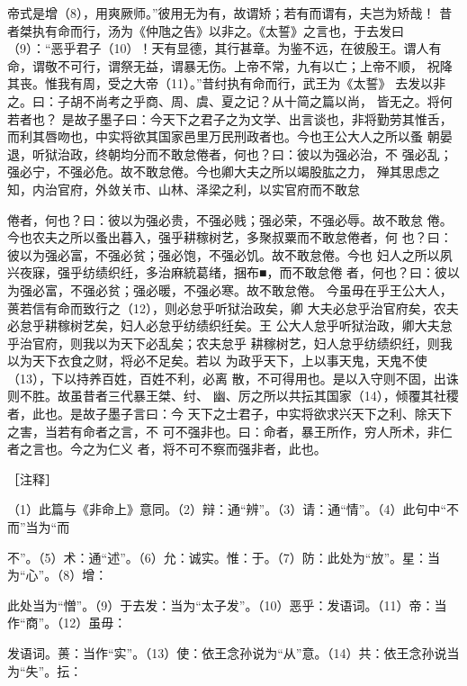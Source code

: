 \documentclass[12pt,UTF8]{ctexbook}
\begin{document}
帝式是增（8），用爽厥师。”彼用无为有，故谓矫；若有而谓有，夫岂为矫哉！ 
昔者桀执有命而行，汤为《仲虺之告》以非之。《太誓》之言也，于去发曰 
（9）：“恶乎君子（10）！天有显德，其行甚章。为鉴不远，在彼殷王。谓人有 
命，谓敬不可行，谓祭无益，谓暴无伤。上帝不常，九有以亡；上帝不顺， 
祝降其丧。惟我有周，受之大帝（11）。”昔纣执有命而行，武王为《太誓》 
去发以非之。曰：子胡不尚考之乎商、周、虞、夏之记？从十简之篇以尚， 
皆无之。将何若者也？ 
是故子墨子曰：今天下之君子之为文学、出言谈也，非将勤劳其惟舌， 
而利其唇吻也，中实将欲其国家邑里万民刑政者也。今也王公大人之所以蚤 
朝晏退，听狱治政，终朝均分而不敢怠倦者，何也？曰：彼以为强必治，不 
强必乱；强必宁，不强必危。故不敢怠倦。今也卿大夫之所以竭股肱之力， 
殚其思虑之知，内治官府，外敛关市、山林、泽梁之利，以实官府而不敢怠 

倦者，何也？曰：彼以为强必贵，不强必贱；强必荣，不强必辱。故不敢怠 
倦。今也农夫之所以蚤出暮入，强乎耕稼树艺，多聚叔粟而不敢怠倦者，何 
也？曰：彼以为强必富，不强必贫；强必饱，不强必饥。故不敢怠倦。今也 
妇人之所以夙兴夜寐，强乎纺绩织纴，多治麻統葛绪，捆布■，而不敢怠倦 
者，何也？曰：彼以为强必富，不强必贫；强必暖，不强必寒。故不敢怠倦。 
今虽毋在乎王公大人，蒉若信有命而致行之（12），则必怠乎听狱治政矣，卿 
大夫必怠乎治官府矣，农夫必怠乎耕稼树艺矣，妇人必怠乎纺绩织纴矣。王 
公大人怠乎听狱治政，卿大夫怠乎治官府，则我以为天下必乱矣；农夫怠乎 
耕稼树艺，妇人怠乎纺绩织纴，则我以为天下衣食之财，将必不足矣。若以 
为政乎天下，上以事天鬼，天鬼不使（13），下以持养百姓，百姓不利，必离 
散，不可得用也。是以入守则不固，出诛则不胜。故虽昔者三代暴王桀、纣、 
幽、厉之所以共抎其国家（14），倾覆其社稷者，此也。是故子墨子言曰：今 
天下之士君子，中实将欲求兴天下之利、除天下之害，当若有命者之言，不 
可不强非也。曰：命者，暴王所作，穷人所术，非仁者之言也。今之为仁义 
者，将不可不察而强非者，此也。 


［注释］ 

（1）此篇与《非命上》意同。（2）辩：通“辨”。（3）请：通“情”。（4）此句中“不而”当为“而 

不”。（5）术：通“述”。（6）允：诚实。惟：于。（7）防：此处为“放”。星：当为“心”。（8）增： 

此处当为“憎”。（9）于去发：当为“太子发”。（10）恶乎：发语词。（11）帝：当作“商”。（12）虽毋： 

发语词。蒉：当作“实”。（13）使：依王念孙说为“从”意。（14）共：依王念孙说当为“失”。抎： 
\end{document}
